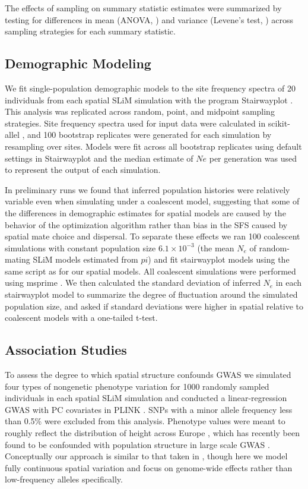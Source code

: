 \documentclass[10pt,twoside,lineno]{gsajnl}
\newif\ifcomments
\newcommand{\ak}[1]{\ifcomments{{\color{red} \it (#1)}}\else{}\fi}
\begin{document}
The effects of sampling on summary statistic estimates were summarized by testing for differences in mean (ANOVA, \citep{Rcore2018}) and variance (Levene's test, \citep{Fox2011}) across sampling strategies for each summary statistic. 

\subsection{Demographic Modeling}
We fit single-population demographic models to the site frequency spectra of 20 individuals from each spatial SLiM simulation with the program Stairwayplot \citep{Liu2015}. This analysis was replicated across random, point, and midpoint sampling strategies. Site frequency spectra used for input data were calculated in scikit-allel \citep{Miles2017}, and 100 bootstrap replicates were generated for each simulation by resampling over sites. Models were fit across all bootstrap replicates using default settings in Stairwayplot and the median estimate of $Ne$ per generation was used to represent the output of each simulation.

In preliminary runs we found that inferred population histories were relatively variable even when simulating under a coalescent model, suggesting that some of the differences in demographic estimates for spatial models are caused by the behavior of the optimization algorithm rather than bias in the SFS caused by spatial mate choice and dispersal. To separate these effects we ran 100 coalescent simulations with constant population size $6.1\times 10^{-3}$ (the mean $N_{e}$ of random-mating SLiM models estimated from $pi$) and fit stairwayplot models using the same script as for our spatial models. All coalescent simulations were performed using msprime \citep{Kelleher2016}. We then calculated the standard deviation of inferred $N_{e}$ in each stairwayplot model to summarize the degree of fluctuation around the simulated population size, and asked if standard deviations were higher in spatial relative to coalescent models with a one-tailed t-test.

\subsection{Association Studies}
To assess the degree to which spatial structure confounds GWAS we simulated four types of nongenetic phenotype variation for 1000 randomly sampled individuals in each spatial SLiM simulation and conducted a linear-regression GWAS with PC covariates in PLINK \citep{PURCELL2007}. SNPs with a minor allele frequency less than 0.5\% were excluded from this analysis. Phenotype values were meant to roughly reflect the distribution of height across Europe \ak{how so? need more details here. Was it matched to mean and variance?}, which has recently been found to be confounded with population structure in large scale GWAS \citep{Berg2018,Sohail2018}. Conceptually our approach is similar to that taken in \citep{Mathieson2012}, though here we model fully continuous spatial variation and focus on genome-wide effects rather than low-frequency alleles specifically. 
\end{document}

